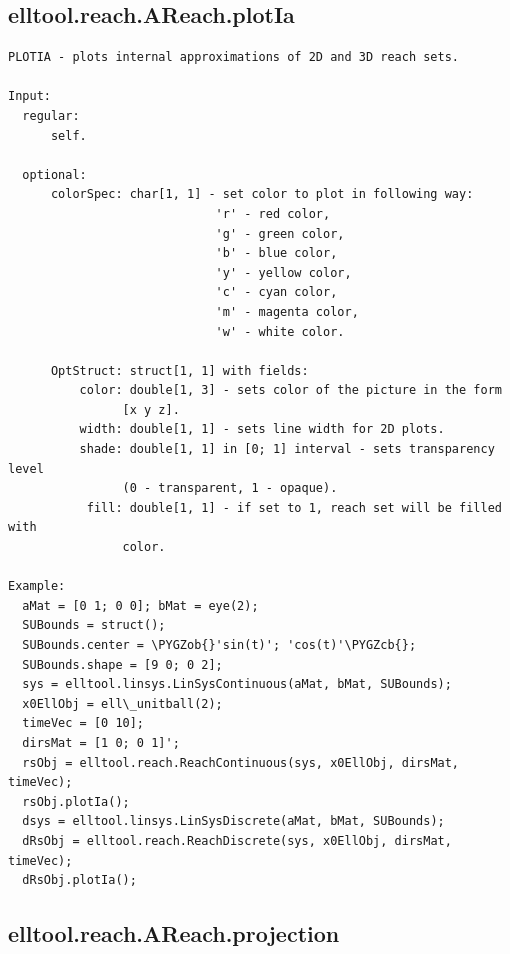 \documentclass[letterpaper,10pt,english]{sphinxmanual}
\def\PYGZob{\char`\{}
\def\PYGZcb{\char`\}}
\begin{document}
\subsection{elltool.reach.AReach.plotIa}
\label{chap_functions:elltool-reach-areach-plotia}
\begin{Verbatim}[commandchars=\\\{\}]
PLOTIA - plots internal approximations of 2D and 3D reach sets.

Input:
  regular:
      self.

  optional:
      colorSpec: char[1, 1] - set color to plot in following way:
                             'r' - red color,
                             'g' - green color,
                             'b' - blue color,
                             'y' - yellow color,
                             'c' - cyan color,
                             'm' - magenta color,
                             'w' - white color.

      OptStruct: struct[1, 1] with fields:
          color: double[1, 3] - sets color of the picture in the form
                [x y z].
          width: double[1, 1] - sets line width for 2D plots.
          shade: double[1, 1] in [0; 1] interval - sets transparency level
                (0 - transparent, 1 - opaque).
           fill: double[1, 1] - if set to 1, reach set will be filled with
                color.

Example:
  aMat = [0 1; 0 0]; bMat = eye(2);
  SUBounds = struct();
  SUBounds.center = \PYGZob{}'sin(t)'; 'cos(t)'\PYGZcb{};
  SUBounds.shape = [9 0; 0 2];
  sys = elltool.linsys.LinSysContinuous(aMat, bMat, SUBounds);
  x0EllObj = ell\_unitball(2);
  timeVec = [0 10];
  dirsMat = [1 0; 0 1]';
  rsObj = elltool.reach.ReachContinuous(sys, x0EllObj, dirsMat, timeVec);
  rsObj.plotIa();
  dsys = elltool.linsys.LinSysDiscrete(aMat, bMat, SUBounds);
  dRsObj = elltool.reach.ReachDiscrete(sys, x0EllObj, dirsMat, timeVec);
  dRsObj.plotIa();
\end{Verbatim}


\subsection{elltool.reach.AReach.projection}
\label{chap_functions:elltool-reach-areach-projection}
\end{document}
